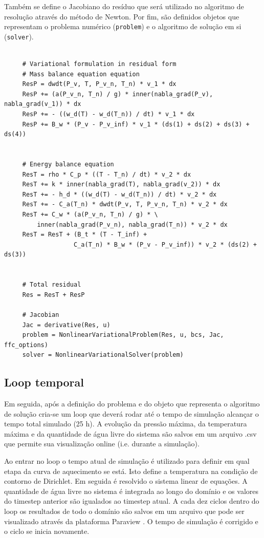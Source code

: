     Também se define o Jacobiano do resíduo que será utilizado no algoritmo de
    resolução através do método de Newton. Por fim, são definidos objetos que
    representam o problema numérico (\texttt{problem}) e o algoritmo de solução em si (\texttt{solver}).
    
    \begin{verbatim}

     # Variational formulation in residual form
     # Mass balance equation equation
     ResP = dwdt(P_v, T, P_v_n, T_n) * v_1 * dx
     ResP += (a(P_v_n, T_n) / g) * inner(nabla_grad(P_v), nabla_grad(v_1)) * dx
     ResP += - ((w_d(T) - w_d(T_n)) / dt) * v_1 * dx
     ResP += B_w * (P_v - P_v_inf) * v_1 * (ds(1) + ds(2) + ds(3) + ds(4))


     # Energy balance equation
     ResT = rho * C_p * ((T - T_n) / dt) * v_2 * dx
     ResT += k * inner(nabla_grad(T), nabla_grad(v_2)) * dx
     ResT += - h_d * ((w_d(T) - w_d(T_n)) / dt) * v_2 * dx
     ResT += - C_a(T_n) * dwdt(P_v, T, P_v_n, T_n) * v_2 * dx
     ResT += C_w * (a(P_v_n, T_n) / g) * \
         inner(nabla_grad(P_v_n), nabla_grad(T_n)) * v_2 * dx
     ResT = ResT + (B_t * (T - T_inf) +
                   C_a(T_n) * B_w * (P_v - P_v_inf)) * v_2 * (ds(2) + ds(3))


     # Total residual
     Res = ResT + ResP

     # Jacobian
     Jac = derivative(Res, u)
     problem = NonlinearVariationalProblem(Res, u, bcs, Jac, ffc_options)
     solver = NonlinearVariationalSolver(problem)
    \end{verbatim} 

    \subsection{Loop temporal}
    Em seguida, após a definição do problema e do objeto que representa o
    algoritmo de solução cria-se um loop que deverá rodar até o tempo de
    simulação alcançar o tempo total simulado (25 h). A evolução da pressão
    máxima, da temperatura máxima e da quantidade de água livre do sistema são
    salvos em um arquivo .csv que permite sua visualização online (i.e. durante
    a simulação).

    Ao entrar no loop o tempo atual de simulação é utilizado para
    definir em qual etapa da curva de aquecimento se está. Isto define a
    temperatura na condição de contorno de Dirichlet. Em seguida é resolvido o
    sistema linear de equações. A quantidade de água livre no sistema é
    integrada ao longo do domínio e os valores do timestep anterior são
    igualados ao timestep atual. A cada dez ciclos dentro do loop os resultados
    de todo o domínio são salvos em um arquivo que pode ser visualizado através
    da plataforma Paraview \cite{paraview2007}. O tempo de simulação é corrigido e o ciclo se
    inicia novamente.

